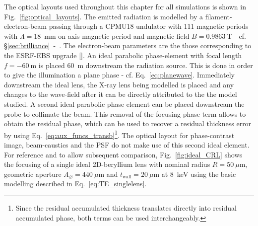 \begin{refsection}
The optical layouts used throughout this chapter for all simulations is shown in Fig.~\ref{fig:optical_layouts}. The emitted radiation is modelled by a filament-electron-beam passing through a CPMU18 undulator with 111 magnetic periods with $\Lambda=18$~mm on-axis magnetic period and magnetic field $B=0.9863~$T - cf. \S\ref{sec:brilliance}~-~\textit{}. The electron-beam parameters are the those corresponding to the ESRF-EBS upgrade [\cite{orangebook}]. An ideal parabolic phase-element with focal length $f=-60~$m is placed 60~m downstream the radiation source. This is done in order to give the illumination a plane phase - cf. Eq.~\ref{eq:planewave}. Immediately downstream the ideal lens, the X-ray lens being modelled is placed and any changes to the wave-field after it can be directly attributed to the the model studied. A second ideal parabolic phase element can be placed downstream the probe to collimate the beam. This removal of the focusing phase term allows to obtain the residual phase, which can be used to recover a residual thickness error by using Eq.~\ref{eq:aux_funcs_transb}\footnote{Since the residual accumulated thickness translates directly into residual accumulated phase, both terms can be used interchangeably.}. The optical layout for phase-contrast image, beam-caustics and the PSF do not make use of this second ideal element. For reference and to allow subsequent comparison, Fig.~\ref{fig:ideal_CRL} shows the focusing of a single ideal 2D-beryllium lens with nominal radius $R=50~\mu\text{m}$, geometric aperture $A_{\diameter}=440~\mu\text{m}$ and $t_\text{wall}=20~\mu$m at 8~keV using the basic modelling described in Eq.~\ref{eq:TE_singlelens}.


\end{refsection}
